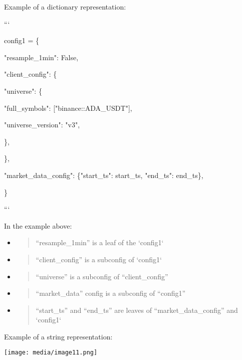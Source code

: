 \documentclass[11pt, reqno]{amsart}
\begin{document}
Example of a dictionary representation:

```

config1 = \{

"resample\_1min": False,

"client\_config": \{

"universe": \{

"full\_symbols": {[}"binance::ADA\_USDT"{]},

"universe\_version": "v3",

\},

\},

"market\_data\_config": \{"start\_ts": start\_ts, "end\_ts": end\_ts\},

\}

```

In the example above:

\begin{itemize}
\item
  \begin{quote}
  ``resample\_1min'' is a leaf of the `config1`
  \end{quote}
\item
  \begin{quote}
  ``client\_config'' is a subconfig of `config1`
  \end{quote}
\item
  \begin{quote}
  ``universe'' is a subconfig of ``client\_config''
  \end{quote}
\item
  \begin{quote}
  ``market\_data'' config is a subconfig of ``config1''
  \end{quote}
\item
  \begin{quote}
  ``start\_ts'' and ``end\_ts'' are leaves of ``market\_data\_config''
  and `config1`
  \end{quote}
\end{itemize}

Example of a string representation:

\texttt{[image: media/image11.png]}
\end{document}
